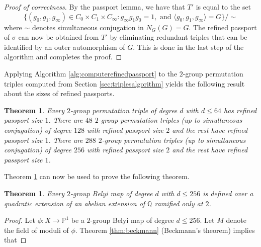 \documentclass{dcthesis}
\newcommand{\PP}{\mathbb P}
\newcommand{\QQ}{\mathbb Q}
\numberwithin{equation}{section}
\newtheorem{theorem}[equation]{Theorem}
\theoremstyle{definition}
\theoremstyle{remark}
\begin{document}
{{{\begin{proof}[Proof of correctness]
      By the passport lemma,
      we have that $T'$ is equal to the set
      \begin{equation}
        \label{eqn:innerauts}
        \{
          (g_0,g_1,g_\infty)\in C_0\times C_1\times C_\infty :
          g_\infty g_1 g_0 = 1,\text{ and }
          \langle g_0,g_1,g_\infty\rangle = G
        \}/\!\sim
      \end{equation}
      where $\sim$ denotes simultaneous conjugation in
      $N_G(G)=G$.
      The refined passport of $\sigma$
      can now be obtained from $T'$
      by eliminating redundant triples that can
      be identified by an outer automorphism of $G$.
      This is done in the last step of the algorithm
      and completes the proof.
    \end{proof}
    Applying
    Algorithm \ref{alg:computerefinedpassport}
    to the $2$-group permutation triples
    computed from Section \ref{sec:triplesalgorithm}
    yields the following result about the
    sizes of refined passports.
    \begin{theorem}
      \label{thm:refinedpassportsizes}
      Every
      $2$-group permutation triple
      of degree $d$ with $d\leq 64$
      has refined passport size $1$.
      There are $48$ $2$-group permutation triples
      (up to simultaneous conjugation)
      of degree $128$ with refined passport size $2$
      and the rest have refined passport size $1$.
      There are $288$ $2$-group permutation triples
      (up to simultaneous conjugation)
      of degree $256$ with refined passport size $2$
      and the rest have refined passport size $1$.
    \end{theorem}
    Theorem \ref{thm:refinedpassportsizes}
    can now be used to prove the following theorem.
    \begin{theorem}
      \label{thm:rerefined}
      Every $2$-group Belyi map
      of degree $d$ with $d\leq 256$
      is defined over a quadratic
      extension of an abelian extension of $\QQ$
      ramified only at $2$.
    \end{theorem}
    \begin{proof}
      Let $\phi\colon X\to\PP^1$ be a
      $2$-group Belyi map of degree $d\leq 256$.
      Let $M$ denote the field of moduli of $\phi$.
      Theorem \ref{thm:beckmann} (Beckmann's theorem)
      implies that

\end{proof}}}}
\end{document}
